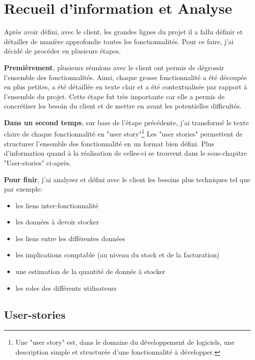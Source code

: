 \section{Recueil d'information et Analyse}

Après avoir défini, avec le client, les grandes lignes du projet il a fallu définir et détailler de manière approfondie toutes les fonctionnalités. Pour ce faire, j'ai décidé de procéder en plusieurs étapes. 

\newpara

\textbf{Premièrement}, plusieurs réunions avec le client ont permis de dégrossir l'ensemble des fonctionnalités. Ainsi, chaque grosse fonctionnalité a été découpée en plus petites, a été détaillée en texte clair et a été contextualisée par rapport à l'ensemble du projet. 
Cette étape fut très importante car elle a permis de concrétiser les besoin du client et de mettre en avant les potentielles difficultés. 

\newpara

\textbf{Dans un second temps}, sur base de l'étape précédente, j'ai transformé le texte claire de chaque fonctionnalité en "user story"\footnote{Une "user story" est, dans le domaine du développement de logiciels, une description simple et structurée d'une fonctionnalité à développer.} Les "user stories" permettent de structurer l'ensemble des fonctionnalité en un format bien défini. Plus d'information quand à la réalisation de celles-ci se trouvent dans le sous-chapitre "User-stories" ci-après. 

\newpara

\textbf{Pour finir}, j'ai analyser et défini avec le client les besoins plus techniques tel que par exemple: 
\begin{itemize}
  \item les liens inter-fonctionnalité
  \item les données à devoir stocker 
  \item les liens entre les différentes données
  \item les implications comptable (au niveau du stock et de la facturation)
  \item une estimation de la quantité de donnée à stocker
  \item les roles des différents utilisateurs
\end{itemize}

\newpage

\subsection{User-stories}

